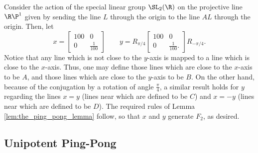 \documentclass[12pt]{article}
\begin{document}
\begin{example}\label{ex:the_special_linear_group}
    Consider the action of the special linear group $\SL_2(\R)$ on the projective line $\R\P^1$ given by sending the line $L$ through the origin to the line $AL$ through the origin.
    Then, let \begin{equation*} x = \begin{bmatrix}
            100 & 0             \\
            0   & \frac{1}{100}
        \end{bmatrix} \qquad y = R_{\pi/4}\begin{bmatrix}
            100 & 0              \\
            0   & \frac{1}{100}.
        \end{bmatrix}
        R_{-\pi/4}.
    \end{equation*}
    Notice that any line which is not close to the $y$-axis is mapped to a line which is close to the $x$-axis.
    Thus, one may define those lines which are close to the $x$-axis to be $A$, and those lines which are close to the $y$-axis to be $B$.
    On the other hand, because of the conjugation by a rotation of angle $\frac{\pi}{4}$, a similar result \color{rsltnText} holds for $y$ regarding the lines $x = y$ (lines near which are defined to be $C$) and $x = -y$ (lines near which are defined to be $D$).
    The required rules of Lemma \ref{lem:the_ping_pong_lemma} follow, so that $x$ and $y$ generate $F_2$, as desired.
\end{example}

\subsection{Unipotent Ping-Pong}
\end{document}
